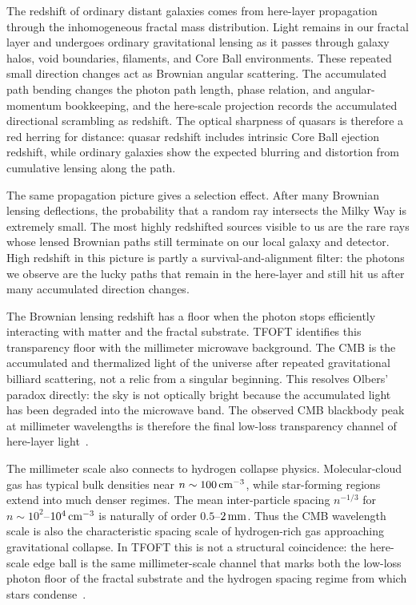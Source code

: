 \documentclass[11pt,a4paper]{article}
\begin{document}
The redshift of ordinary distant galaxies comes from here-layer propagation through the inhomogeneous fractal mass distribution. Light remains in our fractal layer and undergoes ordinary gravitational lensing as it passes through galaxy halos, void boundaries, filaments, and Core Ball environments. These repeated small direction changes act as Brownian angular scattering. The accumulated path bending changes the photon path length, phase relation, and angular-momentum bookkeeping, and the here-scale projection records the accumulated directional scrambling as redshift. The optical sharpness of quasars is therefore a red herring for distance: quasar redshift includes intrinsic Core Ball ejection redshift, while ordinary galaxies show the expected blurring and distortion from cumulative lensing along the path.

The same propagation picture gives a selection effect. After many Brownian lensing deflections, the probability that a random ray intersects the Milky Way is extremely small. The most highly redshifted sources visible to us are the rare rays whose lensed Brownian paths still terminate on our local galaxy and detector. High redshift in this picture is partly a survival-and-alignment filter: the photons we observe are the lucky paths that remain in the here-layer and still hit us after many accumulated direction changes.

The Brownian lensing redshift has a floor when the photon stops efficiently interacting with matter and the fractal substrate. TFOFT identifies this transparency floor with the millimeter microwave background. The CMB is the accumulated and thermalized light of the universe after repeated gravitational billiard scattering, not a relic from a singular beginning. This resolves Olbers' paradox directly: the sky is not optically bright because the accumulated light has been degraded into the microwave band. The observed CMB blackbody peak at millimeter wavelengths is therefore the final low-loss transparency channel of here-layer light~\cite{Fixsen2009,NASAFIRAS,Harrison1987,Wesson1991}.

The millimeter scale also connects to hydrogen collapse physics. Molecular-cloud gas has typical bulk densities near \(n\sim100\,{\rm cm}^{-3}\), while star-forming regions extend into much denser regimes. The mean inter-particle spacing \(n^{-1/3}\) for \(n\sim10^2\)--\(10^4\,{\rm cm}^{-3}\) is naturally of order \(0.5\)--\(2\,{\rm mm}\). Thus the CMB wavelength scale is also the characteristic spacing scale of hydrogen-rich gas approaching gravitational collapse. In TFOFT this is not a structural coincidence: the here-scale edge ball is the same millimeter-scale channel that marks both the low-loss photon floor of the fractal substrate and the hydrogen spacing regime from which stars condense~\cite{Krumholz2010,Evans2020}.
\end{document}
